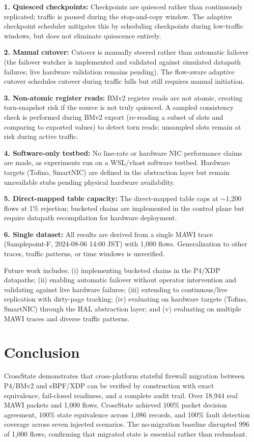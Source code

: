 \documentclass[10pt, conference, compsoc]{IEEEtran}
\begin{document}
\textbf{1. Quiesced checkpoints:} Checkpoints are quiesced rather than
continuously replicated; traffic is paused during the stop-and-copy window.
The adaptive checkpoint scheduler mitigates this by scheduling checkpoints
during low-traffic windows, but does not eliminate quiescence entirely.

\textbf{2. Manual cutover:} Cutover is manually steered rather than automatic
failover (the failover watcher is implemented and validated against simulated
datapath failures; live hardware validation remains pending). The flow-aware
adaptive cutover schedules cutover during traffic lulls but still requires
manual initiation.

\textbf{3. Non-atomic register reads:} BMv2 register reads are not atomic,
creating torn-snapshot risk if the source is not truly quiesced. A sampled
consistency check is performed during BMv2 export (re-reading a subset of
slots and comparing to exported values) to detect torn reads; unsampled slots
remain at risk during active traffic.

\textbf{4. Software-only testbed:} No line-rate or hardware NIC performance
claims are made, as experiments run on a WSL/vhost software testbed. Hardware
targets (Tofino, SmartNIC) are defined in the abstraction layer but remain
unavailable stubs pending physical hardware availability.

\textbf{5. Direct-mapped table capacity:} The direct-mapped table caps at
$\sim$1{,}200 flows at 1\% rejection; bucketed chains are implemented in the
control plane but require datapath recompilation for hardware deployment.

\textbf{6. Single dataset:} All results are derived from a single MAWI trace
(Samplepoint-F, 2024-08-06 14:00 JST) with 1,000 flows. Generalization to
other traces, traffic patterns, or time windows is unverified.

Future work includes: (i) implementing bucketed chains in the P4/XDP datapaths;
(ii) enabling automatic failover without operator intervention and validating
against live hardware failures; (iii) extending to continuous/live replication
with dirty-page tracking; (iv) evaluating on hardware targets (Tofino, SmartNIC)
through the HAL abstraction layer; and (v) evaluating on multiple MAWI traces
and diverse traffic patterns.

\section{Conclusion}
\label{sec:conclusion}
CrossState demonstrates that cross-platform stateful firewall migration between
P4/BMv2 and eBPF/XDP can be verified by construction with exact equivalence,
fail-closed readiness, and a complete audit trail. Over 18{,}944 real MAWI
packets and 1{,}000 flows, CrossState achieved 100\% packet decision agreement,
100\% state equivalence across 1{,}086 records, and 100\% fault detection
coverage across seven injected scenarios. The no-migration baseline disrupted
996 of 1{,}000 flows, confirming that migrated state is essential rather than
redundant.
\end{document}
